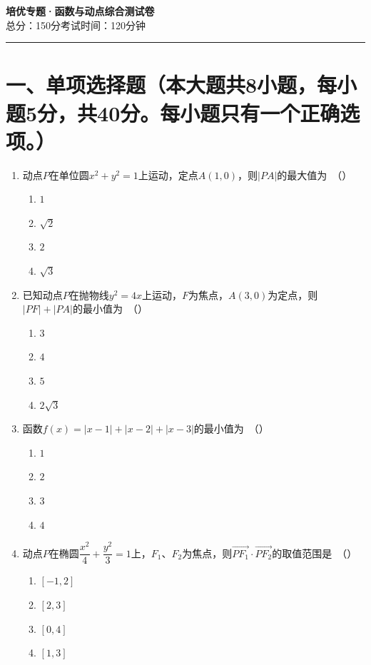 \documentclass[12pt, a4paper]{ctexart}
\begin{document}
\begin{center}
{\Large\bfseries 培优专题·函数与动点综合\quad 测试卷}\\[6pt]
{\normalsize 总分：150分\quad 考试时间：120分钟}
\end{center}
\vspace{6pt}
\noindent\rule{\textwidth}{0.5pt}

\section*{一、单项选择题（本大题共8小题，每小题5分，共40分。每小题只有一个正确选项。）}

\begin{enumerate}

\item 动点$P$在单位圆$x^2+y^2=1$上运动，定点$A(1,0)$，则$|PA|$的最大值为\ （\quad）
\begin{enumerate}[label=\Alph*., itemsep=0pt, topsep=2pt]
\item $1$ \quad \item $\sqrt{2}$ \quad \item $2$ \quad \item $\sqrt{3}$
\end{enumerate}

\item 已知动点$P$在抛物线$y^2=4x$上运动，$F$为焦点，$A(3,0)$为定点，则$|PF|+|PA|$的最小值为\ （\quad）
\begin{enumerate}[label=\Alph*., itemsep=0pt, topsep=2pt]
\item $3$ \quad \item $4$ \quad \item $5$ \quad \item $2\sqrt{3}$
\end{enumerate}

\item 函数$f(x)=|x-1|+|x-2|+|x-3|$的最小值为\ （\quad）
\begin{enumerate}[label=\Alph*., itemsep=0pt, topsep=2pt]
\item $1$ \quad \item $2$ \quad \item $3$ \quad \item $4$
\end{enumerate}

\item 动点$P$在椭圆$\dfrac{x^2}{4}+\dfrac{y^2}{3}=1$上，$F_1$、$F_2$为焦点，则$\overrightarrow{PF_1}\cdot\overrightarrow{PF_2}$的取值范围是\ （\quad）
\begin{enumerate}[label=\Alph*., itemsep=0pt, topsep=2pt]
\item $[-1,2]$ \quad \item $[2,3]$ \quad \item $[0,4]$ \quad \item $[1,3]$
\end{enumerate}


\end{enumerate}
\end{document}
